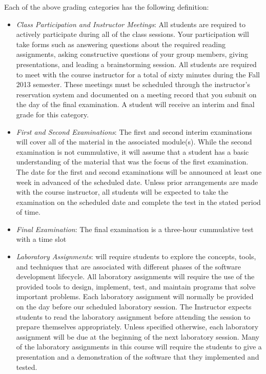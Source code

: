 Each of the above grading categories has the following definition:

\begin{itemize}

	\item {\em Class Participation and Instructor Meetings}: All students are required to actively participate during
		all of the class sessions. Your participation will take forms such as answering questions about the required
		reading assignments, asking constructive questions of your group members, giving presentations, and leading a
		brainstorming session. All students are required to meet with the course instructor for a total of sixty minutes
		during the Fall 2013 semester.  These meetings must be scheduled through the instructor's reservation system and
		documented on a meeting record that you submit on the day of the final examination. A student will receive an interim 
		and final grade for this category.

	\item {\em First and Second Examinations}: The first and second interim examinations will cover all of the material
		in the associated module(s).  While the second examination is not cummulative, it will assume that a student has a
		basic understanding of the material that was the focus of the first examination.  The date for the first and
		second examinations will be announced at least one week in advanced of the scheduled date.  Unless prior
		arrangements are made with the course instructor, all students will be expected to take the examination on the
		scheduled date and complete the test in the stated period of time.

	\item {\em Final Examination}: The final examination is a three-hour cummulative test with a time slot 

	\item {\em Laboratory Assignments}: will require students to explore the concepts, tools, and techniques that are
		associated with different phases of the software development lifecycle.  All laboratory assignments will require
		the use of the provided tools to design, implement, test, and maintain programs that solve important problems.
		Each laboratory assignment will normally be provided on the day before our scheduled laboratory session.  The
		Instructor expects students to read the laboratory assignment before attending the session to prepare themselves
		appropriately.  Unless specified otherwise, each laboratory assignment will be due at the beginning of the next
		laboratory session.  Many of the laboratory assignments in this course will require the students to give a
		presentation and a demonstration of the software that they implemented and tested.  

\end{itemize}


